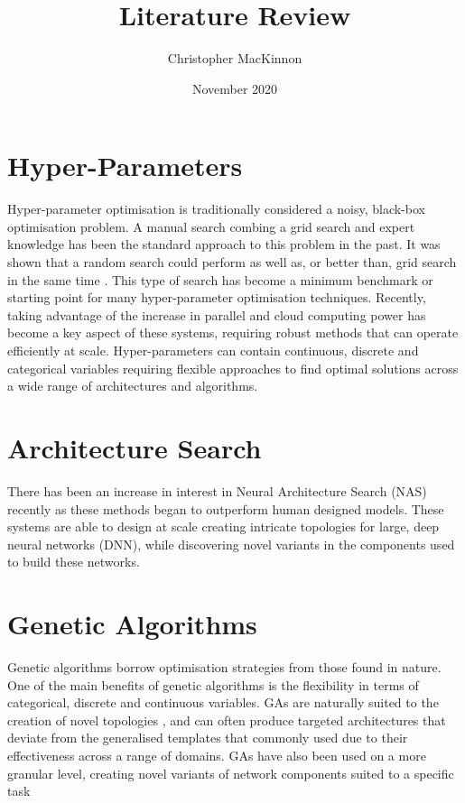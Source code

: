 \documentclass{article}
\title{Literature Review}
\author{Christopher MacKinnon }
\date{November 2020}
\begin{document}
\maketitle

\section{Hyper-Parameters}

Hyper-parameter optimisation is traditionally considered a noisy, black-box optimisation problem. A manual search combing a grid search and expert knowledge has been the standard approach to this problem in the past. It was shown that a random search could perform as well as, or better than, grid search in the same time \cite{50}. This type of search has become a minimum benchmark or starting point for many hyper-parameter optimisation techniques. \cite{39}\cite{48} Recently, taking advantage of the increase in parallel and cloud computing power has become a key aspect of these systems, requiring robust methods that can operate efficiently at scale. Hyper-parameters can contain continuous, discrete and categorical variables requiring flexible approaches to find optimal solutions across a wide range of architectures and algorithms. 

\section {Architecture Search}

There has been an increase in interest in Neural Architecture Search (NAS) recently as these methods began to outperform human designed models. \cite{51}\cite{41} These systems are able to design at scale creating intricate topologies for large, deep neural networks (DNN), while discovering novel variants in the components used to build these networks. \cite{25} \cite{4}



	



\section {Genetic Algorithms}

Genetic algorithms borrow optimisation strategies from those found in nature. One of the main benefits of genetic algorithms is the flexibility in terms of categorical, discrete and continuous variables. GAs are naturally suited to the creation of novel topologies\cite{24} \cite{25}, and can often produce targeted architectures that deviate from the generalised templates that commonly used due to their effectiveness across a range of domains. GAs have also been used on a more granular level, creating novel variants of network components suited to a specific task \cite{25}
\end{document}
